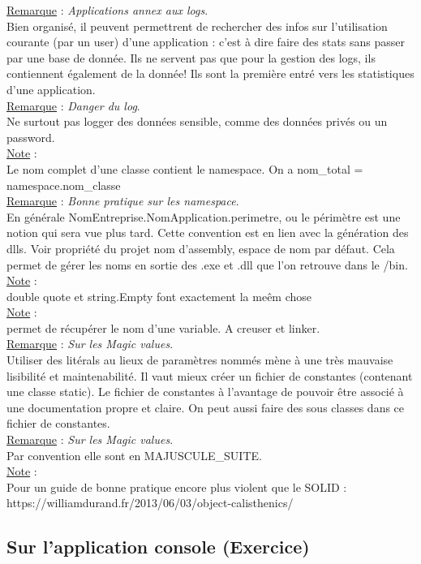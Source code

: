 \documentclass[a4paper,12pt,twoside]{article}
\newcommand{\incode}[1]{{\footnotesize\ttfamily #1}} %
\newcommand{\rem}[2]{\noindent\underline{Remarque} : \textit{#1}.\\ \indent #2}
\newcommand{\note}[1]{\noindent\underline{Note} : \\ \indent #1}
\begin{document}
\rem{Applications annex aux logs}{Bien organisé, il peuvent permettrent de rechercher des infos sur l'utilisation courante (par un user) d'une application : c'est à dire faire des stats sans passer par une base de donnée. Ils ne servent pas que pour la gestion des logs, ils contiennent également de la donnée! Ils sont la première entré vers les statistiques d'une application.}\\

\rem{Danger du log}{Ne surtout pas logger des données sensible, comme des données privés ou un password.}\\

\note{Le nom complet d'une classe contient le namespace. On a nom_total = namespace.nom_classe}\\

\rem{Bonne pratique sur les \incode{namespace}}{En générale NomEntreprise.NomApplication.perimetre, ou le périmètre est une notion qui sera vue plus tard. Cette convention est en lien avec la génération des dlls. Voir propriété du projet nom d'assembly, espace de nom par défaut. Cela permet de gérer les noms en sortie des .exe et .dll que l'on retrouve dans le /bin. }\\

\note{double quote et \incode{string.Empty} font exactement la meêm chose}\\

\note{\incode{nameof} permet de récupérer le nom d'une variable. A creuser et linker.}\\

\rem{Sur les Magic values}{Utiliser des litérals au lieux de paramètres nommés mène à une très mauvaise lisibilité et maintenabilité. Il vaut mieux créer un fichier de constantes (contenant une classe \incode{static}). Le fichier de constantes à l'avantage de pouvoir être associé à une documentation propre et claire. On peut aussi faire des sous classes dans ce fichier de constantes.}\\

\rem{Sur les Magic values}{Par convention elle sont en MAJUSCULE_SUITE.}\\

\note{Pour un guide de bonne pratique encore plus violent que le SOLID : https://williamdurand.fr/2013/06/03/object-calisthenics/}\\

\subsection{Sur l'application console (Exercice)}
\end{document}
